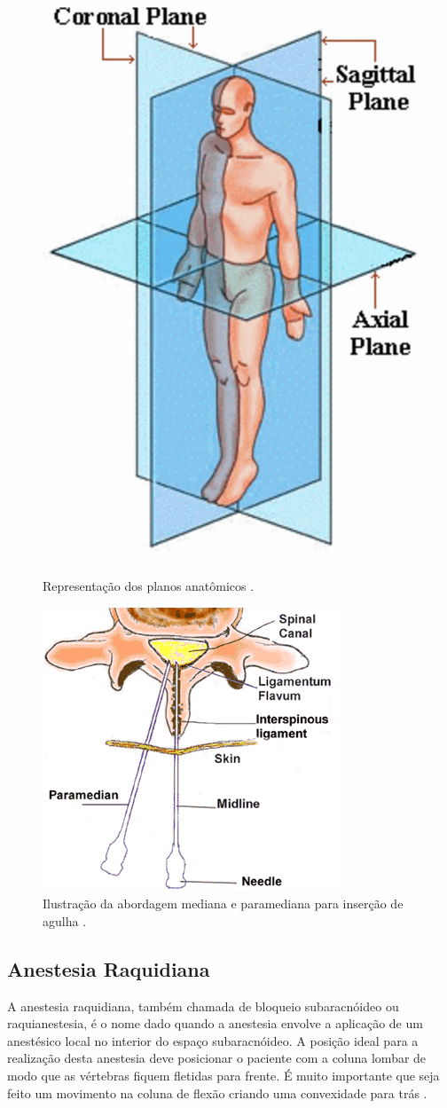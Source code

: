 \begin{figure}[ht!]
    \centering
    \includegraphics[width=0.35\linewidth]{capitulos/figuras/anatomical-planes.png}
    \caption{Representação dos planos anatômicos \cite{Bridwell2019}.}
    \label{fig:planosAnatomicos}
\end{figure}

\begin{figure}[ht!]
    \centering
    \includegraphics[width=0.6\linewidth]{capitulos/figuras/paramedian-midline-MedBroadcast-Tiff.png}
    \caption{Ilustração da abordagem mediana e paramediana para inserção de agulha \cite{MedBroadcast2018}.}
    \label{fig:abordagensInsercaoAgulha}
\end{figure}

\subsection{Anestesia Raquidiana} 
\label{sec:anestesiaRaquidiana}

A anestesia raquidiana, também chamada de bloqueio subaracnóideo ou  raquianestesia, é o nome dado quando a anestesia envolve a aplicação de um anestésico local no interior do espaço subaracnóideo. A posição ideal para a realização desta anestesia deve posicionar o paciente com a coluna lombar de modo que as vértebras fiquem fletidas para frente. É muito importante que seja feito um movimento na coluna de flexão criando uma convexidade para trás \cite{Anesclin2019}.

